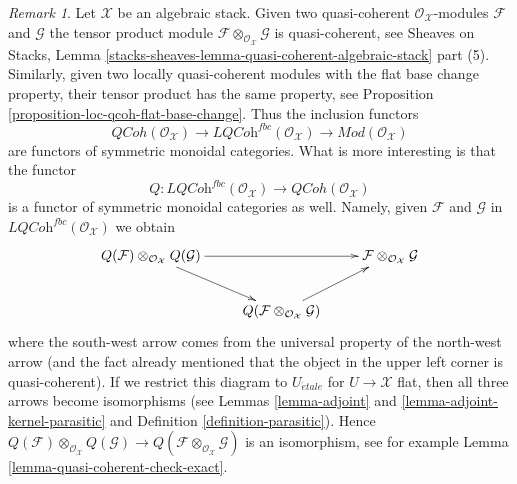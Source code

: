 \documentclass{stacks-project}
\theoremstyle{plain}
\theoremstyle{definition}
\theoremstyle{remark}
\newtheorem{remark}[subsection]{Remark}
\numberwithin{equation}{subsection}
\def\etale{{\acute{e}tale}}
\def\QCoh{\mathit{QCoh}}
\begin{document}
\begin{remark}
\label{remark-QCoh-tensor}
Let $\mathcal{X}$ be an algebraic stack. Given two quasi-coherent
$\mathcal{O}_\mathcal{X}$-modules $\mathcal{F}$ and $\mathcal{G}$
the tensor product module
$\mathcal{F} \otimes_{\mathcal{O}_\mathcal{X}} \mathcal{G}$
is quasi-coherent, see Sheaves on Stacks, Lemma
\ref{stacks-sheaves-lemma-quasi-coherent-algebraic-stack} part (5).
Similarly, given two locally quasi-coherent modules with
the flat base change property, their tensor product has the
same property, see Proposition \ref{proposition-loc-qcoh-flat-base-change}.
Thus the inclusion functors
$$
\QCoh(\mathcal{O}_\mathcal{X}) \to
\textit{LQCoh}^{fbc}(\mathcal{O}_\mathcal{X}) \to
\textit{Mod}(\mathcal{O}_\mathcal{X})
$$
are functors of symmetric monoidal categories. What is more interesting
is that the functor
$$
Q :
\textit{LQCoh}^{fbc}(\mathcal{O}_\mathcal{X})
\longrightarrow
\QCoh(\mathcal{O}_\mathcal{X})
$$
is a functor of symmetric monoidal categories as well. Namely, given
$\mathcal{F}$ and $\mathcal{G}$ in
$\textit{LQCoh}^{fbc}(\mathcal{O}_\mathcal{X})$ we obtain
$$
\xymatrix{
Q(\mathcal{F})
\otimes_{\mathcal{O}_\mathcal{X}}
Q(\mathcal{G}) \ar[rr] \ar[rd] & &
\mathcal{F}
\otimes_{\mathcal{O}_\mathcal{X}}
\mathcal{G} \\
&
Q(\mathcal{F} \otimes_{\mathcal{O}_\mathcal{X}} \mathcal{G}) \ar[ru]
}
$$
where the south-west arrow comes from the universal property
of the north-west arrow (and the fact already mentioned that
the object in the upper left corner is quasi-coherent).
If we restrict this diagram to $U_\etale$ for $U \to \mathcal{X}$
flat, then all three arrows become isomorphisms (see
Lemmas \ref{lemma-adjoint} and \ref{lemma-adjoint-kernel-parasitic}
and Definition \ref{definition-parasitic}).
Hence $Q(\mathcal{F}) \otimes_{\mathcal{O}_\mathcal{X}}
Q(\mathcal{G}) \to
Q(\mathcal{F} \otimes_{\mathcal{O}_\mathcal{X}} \mathcal{G})$
is an isomorphism, see for example
Lemma \ref{lemma-quasi-coherent-check-exact}.
\end{remark}
\end{document}
